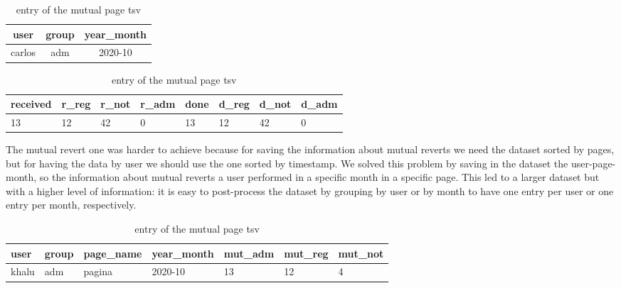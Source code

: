 \begin{table}[H]
    \centering
    \begin{tabularx}{\columnwidth}{@{}ccc@{}}
        \midrule
        \textbf{user} & \textbf{group} & \textbf{year\_month} \\ \toprule
        carlos & adm & 2020-10  \\
        
         \bottomrule
    \end{tabularx}
    \begin{tabularx}{\columnwidth}{@{}XXXXXXXX@{}}
        \midrule
        \textbf{received} & \textbf{r\_reg}  & \textbf{r\_not} & \textbf{r\_adm} & \textbf{done} & \textbf{d\_reg} & \textbf{d\_not} & \textbf{d\_adm}\\ \toprule
        13 & 12 & 42  & 0 & 13 & 12 & 42  & 0  \\
        
         \bottomrule
    \end{tabularx}
    
    \caption{entry of the mutual page tsv \label{table:revks}}
\end{table}


The mutual revert one was harder to achieve because for saving the information about mutual reverts
we need the dataset sorted by pages, but for having the data by user we should use the one sorted
by timestamp. We solved this problem by saving in the dataset the user-page-month, so the information
about mutual reverts a user performed in a specific month in a specific page. This led to a larger dataset but with a
higher level of information: it is easy to post-process the dataset by grouping by user or by month
to have one entry per user or one entry per month, respectively. 


\begin{table}[H]
    \centering
    \begin{tabularx}{\columnwidth}{@{}XXXXXXX@{}}
        \midrule
        \textbf{user} & \textbf{group} & \textbf{page\_name}& \textbf{year\_month} & \textbf{mut\_adm}& \textbf{mut\_reg}& \textbf{mut\_not}\\ \toprule
        khalu & adm & pagina & 2020-10 & 13 & 12 & 4 \\
        
         \bottomrule
    \end{tabularx}

    
    \caption{entry of the mutual page tsv \label{table:rjevks}}
\end{table}




